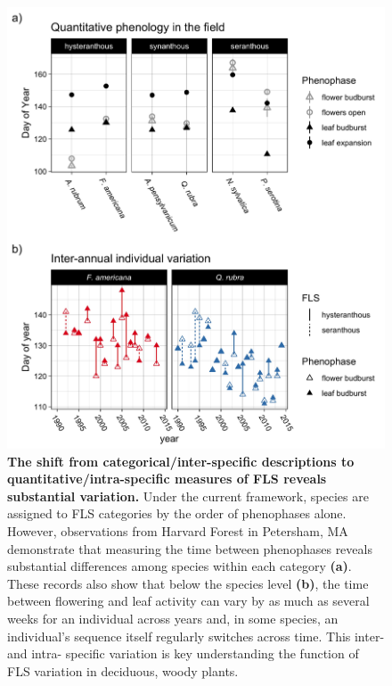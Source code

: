 \documentclass{article}
\begin{document}
 \begin{figure}[h!]
        \centering
          \includegraphics[width=\textwidth]{..//HarvardForest/FLS_viz.jpeg}
          \caption{\textbf{The shift from categorical/inter-specific descriptions to quantitative/intra-specific measures of FLS reveals substantial variation.} Under the current framework, species are assigned to FLS categories by the order of phenophases alone. However, observations from Harvard Forest in Petersham, MA demonstrate that measuring the time between phenophases reveals substantial differences among species within each category \textbf{(a)}. These records also show that below the species level \textbf{(b)}, the time between flowering and leaf activity can vary by as much as several weeks for an individual across years and, in some species, an individual's sequence itself regularly switches across time. This inter- and intra- specific variation is key understanding the function of FLS variation in deciduous, woody plants.}
        \label{fig:vizzy}
    \end{figure}

\pagebreak  
\end{document}
